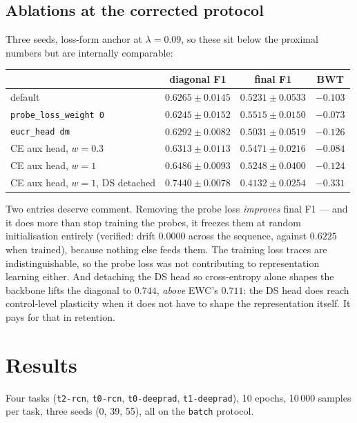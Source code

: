 \documentclass{article}
\begin{document}
\subsection{Ablations at the corrected protocol}

Three seeds, loss-form anchor at $\lambda=0.09$, so these sit below the proximal
numbers but are internally comparable:

\begin{center}
\begin{tabular}{lccc}
\toprule
 & diagonal F1 & final F1 & BWT \\
\midrule
default                          & $0.6265 \pm 0.0145$ & $0.5231 \pm 0.0533$ & $-0.103$ \\
\texttt{probe\_loss\_weight 0}   & $0.6245 \pm 0.0152$ & $\mathbf{0.5515 \pm 0.0150}$ & $-0.073$ \\
\texttt{eucr\_head dm}           & $0.6292 \pm 0.0082$ & $0.5031 \pm 0.0519$ & $-0.126$ \\
CE aux head, $w=0.3$             & $0.6313 \pm 0.0113$ & $0.5471 \pm 0.0216$ & $-0.084$ \\
CE aux head, $w=1$               & $0.6486 \pm 0.0093$ & $0.5248 \pm 0.0400$ & $-0.124$ \\
CE aux head, $w=1$, DS detached  & $\mathbf{0.7440 \pm 0.0078}$ & $0.4132 \pm 0.0254$ & $-0.331$ \\
\bottomrule
\end{tabular}
\end{center}

Two entries deserve comment. Removing the probe loss \emph{improves} final F1 ---
and it does more than stop training the probes, it freezes them at random
initialisation entirely (verified: drift $0.0000$ across the sequence, against
$0.6225$ when trained), because nothing else feeds them. The training loss traces
are indistinguishable, so the probe loss was not contributing to representation
learning either. And detaching the DS head so cross-entropy alone shapes the
backbone lifts the diagonal to $0.744$, \emph{above} EWC's $0.711$: the DS head
does reach control-level plasticity when it does not have to shape the
representation itself. It pays for that in retention.

\section{Results}

Four tasks (\texttt{t2-rcn}, \texttt{t0-rcn}, \texttt{t0-deeprad},
\texttt{t1-deeprad}), 10 epochs, 10\,000 samples per task, three seeds
(0, 39, 55), all on the \texttt{batch} protocol.
\end{document}
